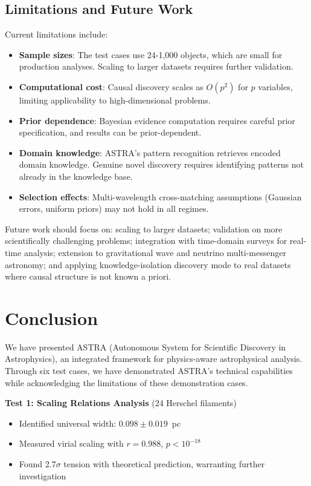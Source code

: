 \documentclass[usenatbib]{rasti}
\begin{document}
\subsection{Limitations and Future Work}

Current limitations include:
\begin{itemize}
\item \textbf{Sample sizes}: The test cases use 24-1,000 objects, which are small for production analyses. Scaling to larger datasets requires further validation.
\item \textbf{Computational cost}: Causal discovery scales as $O(p^2)$ for $p$ variables, limiting applicability to high-dimensional problems.
\item \textbf{Prior dependence}: Bayesian evidence computation requires careful prior specification, and results can be prior-dependent.
\item \textbf{Domain knowledge}: ASTRA's pattern recognition retrieves encoded domain knowledge. Genuine novel discovery requires identifying patterns not already in the knowledge base.
\item \textbf{Selection effects}: Multi-wavelength cross-matching assumptions (Gaussian errors, uniform priors) may not hold in all regimes.
\end{itemize}

Future work should focus on: scaling to larger datasets; validation on more scientifically challenging problems; integration with time-domain surveys for real-time analysis; extension to gravitational wave and neutrino multi-messenger astronomy; and applying knowledge-isolation discovery mode to real datasets where causal structure is not known a priori.

\section{Conclusion}

We have presented ASTRA (Autonomous System for Scientific Discovery in Astrophysics), an integrated framework for physics-aware astrophysical analysis. Through six test cases, we have demonstrated ASTRA's technical capabilities while acknowledging the limitations of these demonstration cases.

\textbf{Test 1: Scaling Relations Analysis} (24 Herschel filaments)
\begin{itemize}
\item Identified universal width: $0.098 \pm 0.019$~pc
\item Measured virial scaling with $r = 0.988$, $p < 10^{-18}$
\item Found 2.7$\sigma$ tension with theoretical prediction, warranting further investigation
\end{itemize}
\end{document}
